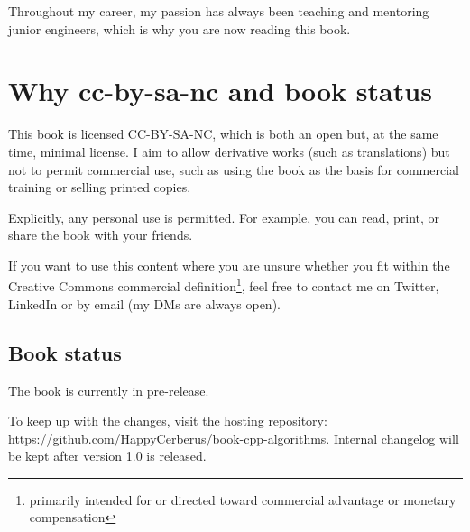 Throughout my career, my passion has always been teaching and mentoring junior engineers, which is why you are now reading this book.

\section{Why cc-by-sa-nc and book status}

This book is licensed CC-BY-SA-NC, which is both an open but, at the same time, minimal license. I aim to allow derivative works (such as translations) but not to permit commercial use, such as using the book as the basis for commercial training or selling printed copies.

Explicitly, any personal use is permitted. For example, you can read, print, or share the book with your friends.

If you want to use this content where you are unsure whether you fit within the Creative Commons commercial definition\footnote{primarily intended for or directed toward commercial advantage or monetary compensation}, feel free to contact me on Twitter, LinkedIn or by email (my DMs are always open).

\subsection{Book status}

The book is currently in pre-release.

To keep up with the changes, visit the hosting repository: \url{https://github.com/HappyCerberus/book-cpp-algorithms}. Internal changelog will be kept after version 1.0 is released.